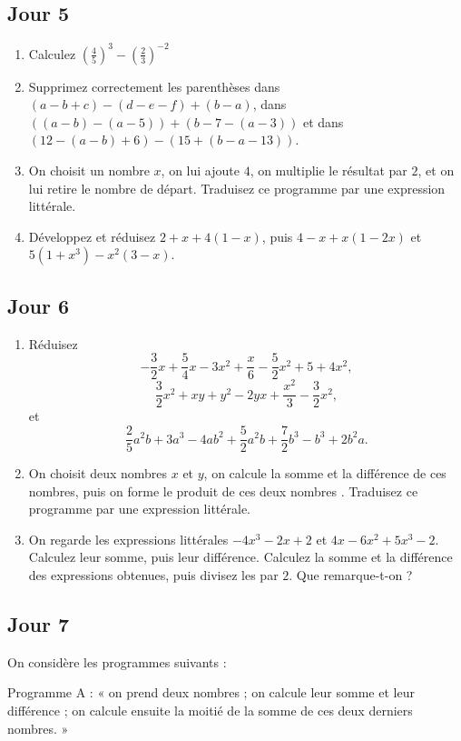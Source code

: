 \documentclass[14 pt, fleqn]{extarticle}
\theoremstyle{plain}
\begin{document}
 
 \subsection*{Jour 5}
 
 \begin{enumerate}
 \item Calculez $(\frac45)^3 - (\frac23)^{-2}$
 \item Supprimez correctement les parenthèses dans 
 $(a-b+c) - (d-e-f) + (b-a)$, dans
 $( (a-b) - (a-5)) + (b-7 - (a-3) )$
 et dans $(12-(a-b)+6)-(15+(b-a-13) )$.
 \item On choisit un nombre $x$, on lui ajoute $4$, on multiplie le résultat par $2$, et on lui retire le nombre de départ. Traduisez ce programme par une expression littérale. 
 \item Développez et réduisez $2 + x + 4(1-x)$, puis $4 - x + x(1-2x)$ et $5(1+x^3) - x^2(3 - x)$.
 \end{enumerate}
 \newpage
  \subsection*{Jour 6}
 
 \begin{enumerate}
 \item Réduisez 
 $$ - \frac32x+ \frac54x - 3x^2 + \frac{x}6 - \frac52 x^2 + 5 + 4 x^2,$$
 $$ \frac32 x^2 + xy + y^2 - 2yx + \frac{x^2}3 - \frac32x^2,$$
 et $$ \frac25 a^2b + 3a^3 - 4ab^2 + \frac52 a^2b + \frac72 b^3 - b^3 + 2 b^2a.$$ 
 \item On choisit deux nombres $x$ et $y$, on calcule la somme et la différence de ces nombres, puis on forme le produit de ces deux nombres . Traduisez ce programme par une expression littérale. 
 \item On regarde les expressions littérales $-4x^3 - 2x +2$ et $4x-6x^2+5x^3 - 2$. 
 Calculez leur somme, puis leur différence. 
 Calculez la somme et la différence des expressions obtenues, puis divisez les par $2$. Que remarque-t-on ? 
 \end{enumerate}
 
 \subsection*{Jour 7}
 On considère les programmes suivants : 
 
 Programme A : «
 on prend deux nombres ; on calcule leur somme et leur différence ; on calcule ensuite la moitié de la somme de ces deux derniers nombres. »
 
\end{document}
